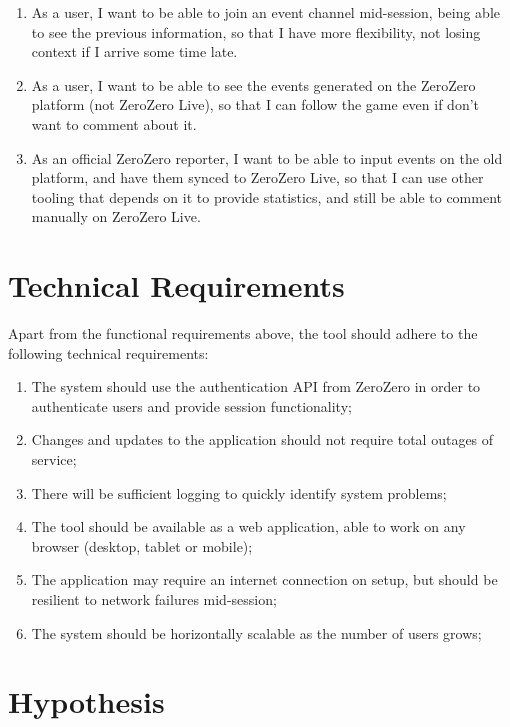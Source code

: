 \begin{enumerate}[leftmargin  = 3.25\parindent, align=left, label=US\arabic*, start=1]
    \item As a user, I want to be able to join an event channel mid-session, being able to see the previous information, so that I have more flexibility, not losing context if I arrive some time late.
    \item\label{user-story:sync-to-api} As a user, I want to be able to see the events generated on the ZeroZero platform (not ZeroZero Live), so that I can follow the game even if don't want to comment about it.
    \item\label{user-story:sync-from-api} As an official ZeroZero reporter, I want to be able to input events on the old platform, and have them synced to ZeroZero Live, so that I can use other tooling that depends on it to provide statistics, and still be able to comment manually on ZeroZero Live.
\end{enumerate}

\section{Technical Requirements}\label{sec:tech-reqs}

Apart from the functional requirements above, the tool should adhere to the following technical requirements:

\begin{enumerate}[leftmargin  = 3.25\parindent, align=left, label=TR\arabic*, start=1]
    \item The system should use the authentication API from ZeroZero in order to authenticate users and provide session functionality;
    \item Changes and updates to the application should not require total outages of service;
    \item There will be sufficient logging to quickly identify system problems;
    \item The tool should be available as a web application, able to work on any browser (desktop, tablet or mobile);
    \item The application may require an internet connection on setup, but should be resilient to network failures mid-session;
    \item The system should be horizontally scalable as the number of users grows;
\end{enumerate}

\section{Hypothesis}\label{sec-hyposthesis}

